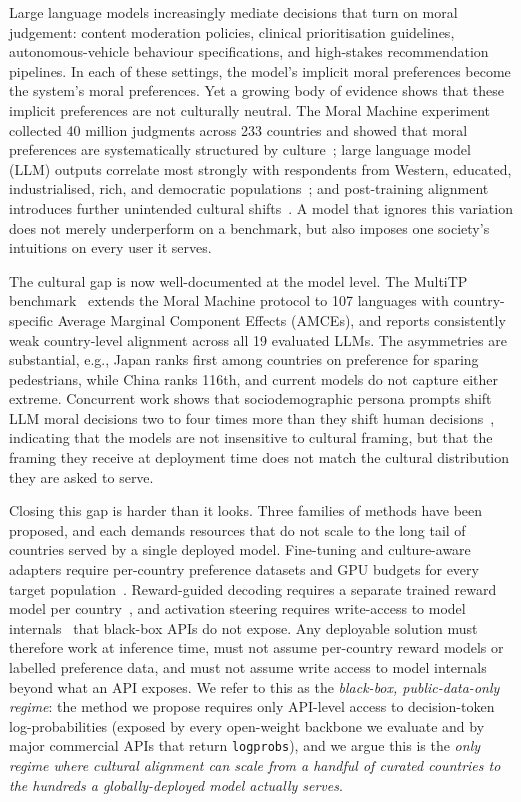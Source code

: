 \documentclass{article}
\begin{document}
Large language models increasingly mediate decisions that turn on moral judgement: content moderation policies, clinical prioritisation guidelines, autonomous-vehicle behaviour specifications, and high-stakes recommendation pipelines. In each of these settings, the model's implicit moral preferences become the system's moral preferences. Yet a growing body of evidence shows that these implicit preferences are not culturally neutral. The Moral Machine experiment collected 40 million judgments across 233 countries and showed that moral preferences are systematically structured by culture~\citep{awad2018moral}; large language model (LLM) outputs correlate most strongly with respondents from Western, educated, industrialised, rich, and democratic populations~\citep{henrich2010weirdest, santurkar2023opinions}; and post-training alignment introduces further unintended cultural shifts~\citep{ryan2024unintended, zewail2025moral}. A model that ignores this variation does not merely underperform on a benchmark, but also imposes one society's intuitions on every user it serves.

The cultural gap is now well-documented at the model level. The MultiTP benchmark~\citep{jin2025multitp} extends the Moral Machine protocol to 107 languages with country-specific Average Marginal Component Effects (AMCEs), and reports consistently weak country-level alignment across all 19 evaluated LLMs. The asymmetries are substantial, e.g., Japan ranks first among countries on preference for sparing pedestrians, while China ranks 116th, and current models do not capture either extreme. Concurrent work shows that sociodemographic persona prompts shift LLM moral decisions two to four times more than they shift human decisions~\citep{kim2025persona}, indicating that the models are not insensitive to cultural framing, but that the framing they receive at deployment time does not match the cultural distribution they are asked to serve.

Closing this gap is harder than it looks. Three families of methods have been proposed, and each demands resources that do not scale to the long tail of countries served by a single deployed model. Fine-tuning and culture-aware adapters require per-country preference datasets and GPU budgets for every target population~\citep{zhang2026culturemanager, yao2024caredio}. Reward-guided decoding requires a separate trained reward model per country~\citep{khanov2024args, mudgal2024controlled}, and activation steering requires write-access to model internals~\citep{arditi2025refusal, turner2023activation} that black-box APIs do not expose. Any deployable solution must therefore work at inference time, must not assume per-country reward models or labelled preference data, and must not assume write access to model internals beyond what an API exposes. We refer to this as the \emph{black-box, public-data-only regime}: the method we propose requires only API-level access to decision-token log-probabilities (exposed by every open-weight backbone we evaluate and by major commercial APIs that return \texttt{logprobs}), and we argue this is the \emph{only regime where cultural alignment can scale from a handful of curated countries to the hundreds a globally-deployed model actually serves}.
\end{document}
